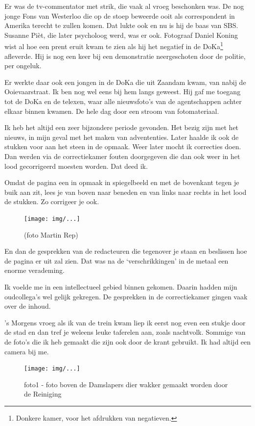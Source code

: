 \documentclass[12pt,twoside]{memoir}
\begin{document}
Er was de tv-commentator met strik, die vaak al vroeg beschonken was. De nog jonge Fons van Westerloo die op de stoep beweerde ooit als correspondent in Amerika terecht te zullen komen. Dat lukte ook en nu is hij de baas van SBS. Susanne Pièt, die later psycholoog werd, was er ook. Fotograaf Daniel Koning wist al hoe een prent eruit kwam te zien als hij het negatief in de DoKa\footnote{Donkere kamer, voor het afdrukken van negatieven.} afleverde. Hij is nog een keer bij een demonstratie neergeschoten door de politie, per ongeluk. 

Er werkte daar ook een jongen in de DoKa die uit Zaandam kwam,  van nabij de Ooievaarstraat. Ik ben nog wel eens bij hem langs geweest. Hij gaf me toegang tot de DoKa en de telexen, waar alle nieuwsfoto’s van de agentschappen achter elkaar binnen kwamen. De hele dag door een stroom van fotomateriaal. 

Ik heb het altijd een zeer bijzondere periode gevonden. Het bezig zijn met het nieuws, in mijn geval met het maken van advententies. Later haalde ik ook de stukken voor aan het steen in de opmaak. Weer later mocht ik correcties doen. Dan werden via de correctiekamer fouten doorgegeven die dan ook weer in het lood gecorrigeerd moesten worden. Dat deed ik. 

Omdat de pagina een in opmaak in spiegelbeeld en met de bovenkant tegen je buik aan zit, lees je van boven naar beneden en van links naar rechts in het lood de stukken. Zo corrigeer je ook. 

\begin{figure}[t]
\texttt{[image: img/...]}
\caption{(foto Martin Rep)}
\end{figure}

En dan de gesprekken van de redacteuren die tegenover je staan en beslissen hoe de pagina er uit zal zien. Dat was na de `verschrikkingen' in de metaal een enorme verademing.

Ik voelde me in een intellectueel gebied binnen gekomen. Daarin hadden mijn oudcollega’s wel gelijk gekregen. De gesprekken in de correctiekamer gingen vaak over de inhoud. 

’s Morgens vroeg als ik van de trein kwam liep ik eerst nog even een stukje door de stad en dan tref je weleens leuke taferelen aan, zoals nachtvolk. Sommige van de foto’s die ik heb gemaakt die zijn ook door de krant gebruikt. Ik had altijd een camera bij me.

\begin{figure}[t]
\texttt{[image: img/...]}
\caption{foto1 - foto boven de Damslapers dier wakker gemaakt worden door de Reiniging}
\end{figure}
\end{document}
